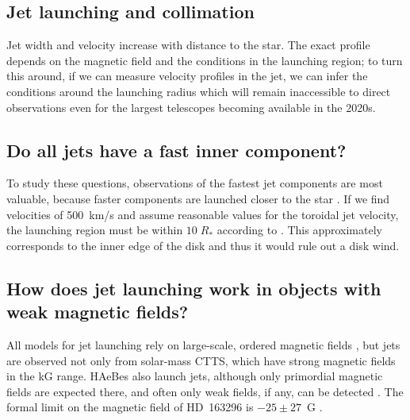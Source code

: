 \documentclass[12pt]{article}
\begin{document}
\subsection{Jet launching and collimation}
Jet width and velocity increase with distance to the star. The exact profile depends on the magnetic field and the conditions in the launching region; to turn this around, if we can measure velocity profiles in the jet, we can infer the conditions around the launching radius which will remain inaccessible to direct observations even for the largest telescopes becoming available in the 2020s.

\subsection{Do all jets have a fast inner component?}
To study these questions, observations of the fastest jet components are most
valuable, because faster components are launched closer to the star
\citep{2003ApJ...590L.107A}. If we find velocities of 500~km/s and assume
reasonable values for the toroidal jet velocity, the launching region must be
within $10\;R_*$ according to \citet{2003ApJ...590L.107A}. This approximately
corresponds to the inner edge of the disk and thus it would rule out a disk
wind.

\subsection{How does jet launching work in objects with weak magnetic fields?}
All models for jet launching rely on large-scale, ordered magnetic fields \citep{2009ASSP...13...99F}, but jets are observed not only from solar-mass CTTS, which have strong magnetic fields in the kG range. HAeBes also launch jets, although only primordial magnetic fields are expected there, and often only weak fields, if any, can be detected \citep{2007A&A...463.1039H,2007MNRAS.376.1145W}. The formal limit on the magnetic field of HD~163296 is $-25\pm 27$~G \citep{2007A&A...463.1039H}. 
\end{document}
